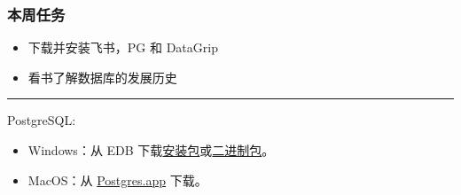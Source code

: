 \documentclass[aspectratio=169, 14pt]{beamer}
\begin{document}
\begin{frame}
    \frametitle{本周任务}
\begin{itemize}
    \item 下载并安装飞书，PG 和 DataGrip
    \item 看书了解数据库的发展历史
\end{itemize}   

\pause
\noindent\rule{\textwidth}{1pt}

PostgreSQL:

\begin{itemize}
    \item {} Windows：从 EDB 下载\href{https://www.enterprisedb.com/downloads/postgres-postgresql-downloads}{安装包}或\href{https://www.enterprisedb.com/download-postgresql-binaries}{二进制包}。
    \item {} MacOS：从 \href{https://postgres.app/}{Postgres.app} 下载。
\end{itemize}   

\end{frame}
\end{document}
